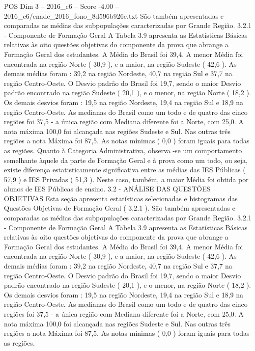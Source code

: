 \begin{textsample}{POS Dim 3 – 2016\_c6 – Score -4.00 – 2016\_c6/enade\_2016\_fono\_8d596b926e.txt}
São também apresentadas e comparadas as médias das subpopulações caracterizadas por Grande Região. 3.2.1 - Componente de Formação Geral A Tabela 3.9 apresenta as Estatísticas Básicas relativas às oito questões objetivas do componente da prova que abrange a Formação Geral dos estudantes.
A Média do Brasil foi 39,4.
A menor Média foi encontrada na região Norte ( 30,9 ), e a maior, na região Sudeste ( 42,6 ).
As demais médias foram : 39,2 na região Nordeste, 40,7 na região Sul e 37,7 na região Centro-Oeste.
O Desvio padrão do Brasil foi 19,7, sendo o maior Desvio padrão encontrado na região Sudeste ( 20,1 ), e o menor, na região Norte ( 18,2 ).
Os demais desvios foram : 19,5 na região Nordeste, 19,4 na região Sul e 18,9 na região Centro-Oeste.
As medianas do Brasil como um todo e de quatro das cinco regiões foi 37,5 - a única região com Mediana diferente foi a Norte, com 25,0.
A nota máxima 100,0 foi alcançada nas regiões Sudeste e Sul.
Nas outras três regiões a nota Máxima foi 87,5.
As notas mínimas ( 0,0 ) foram iguais para todas as regiões.
Quanto à Categoria Administrativa, observa -se um comportamento semelhante àquele da parte de Formação Geral e à prova como um todo, ou seja, existe diferença estatisticamente significativa entre as médias das IES Públicas ( 57,9 ) e IES Privadas ( 51,3 ).
Neste caso, também, a maior Média foi obtida por alunos de IES Públicas de ensino. 3.2 - ANÁLISE DAS QUESTÕES OBJETIVAS Esta seção apresenta estatísticas selecionadas e histogramas das Questões Objetivas de Formação Geral ( 3.2.1 ).
São também apresentadas e comparadas as médias das subpopulações caracterizadas por Grande Região. 3.2.1 - Componente de Formação Geral A Tabela 3.9 apresenta as Estatísticas Básicas relativas às oito questões objetivas do componente da prova que abrange a Formação Geral dos estudantes.
A Média do Brasil foi 39,4.
A menor Média foi encontrada na região Norte ( 30,9 ), e a maior, na região Sudeste ( 42,6 ).
As demais médias foram : 39,2 na região Nordeste, 40,7 na região Sul e 37,7 na região Centro-Oeste.
O Desvio padrão do Brasil foi 19,7, sendo o maior Desvio padrão encontrado na região Sudeste ( 20,1 ), e o menor, na região Norte ( 18,2 ).
Os demais desvios foram : 19,5 na região Nordeste, 19,4 na região Sul e 18,9 na região Centro-Oeste.
As medianas do Brasil como um todo e de quatro das cinco regiões foi 37,5 - a única região com Mediana diferente foi a Norte, com 25,0.
A nota máxima 100,0 foi alcançada nas regiões Sudeste e Sul.
Nas outras três regiões a nota Máxima foi 87,5.
As notas mínimas ( 0,0 ) foram iguais para todas as regiões.

\end{textsample}
